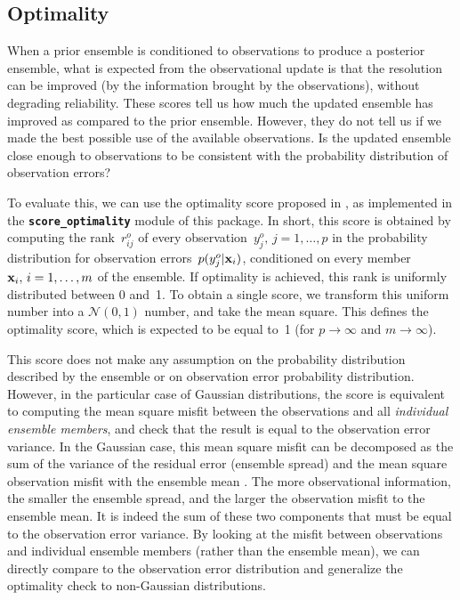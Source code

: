 \documentclass[11pt]{article}
\begin{document}
\subsection{Optimality}

When a prior ensemble is conditioned to observations
to produce a posterior ensemble,
what is expected from the observational update is
that the resolution can be improved (by the information brought
by the observations), without degrading reliability.
These scores tell us how much the updated ensemble has improved
as compared to the prior ensemble.
However, they do not tell us if we made the best possible use of the available observations.
Is the updated ensemble close enough to observations
to be consistent with the probability distribution of observation errors?

To evaluate this, we can use the optimality score proposed in \citet{BRAN19},
as implemented in the {\tt\bf score\_optimality} module of this package.
In short, this score is obtained by computing the rank~$r_{ij}^o$
of every observation~$y^o_j,\,j=1,\ldots,p$ in the probability
distribution for observation errors~$p(y^o_j|{\bf x}_i)$,
conditioned on every member~${\bf x}_i,\,i=1,\ldots,m$ of the ensemble.
If optimality is achieved, this rank is uniformly distributed between 0 and~1.
To obtain a single score, we transform this uniform number
into a ${\mathcal N}(0,1)$ number, and take the mean square.
This defines the optimality score, which is expected to be equal to~1
(for $p\rightarrow\infty$ and $m\rightarrow\infty$).

This score does not make any assumption on the probability distribution
described by the ensemble or on observation error probability distribution.
However, in the particular case of Gaussian distributions,
the score is equivalent to computing the mean square misfit between the observations
and all {\em individual ensemble members},
and check that the result is equal to the observation error variance.
In the Gaussian case, this mean square misfit can be decomposed as the sum
of the variance of the residual error (ensemble spread)
and the mean square observation misfit with the ensemble mean \citep{TALA99}.
The more observational information, the smaller the ensemble spread,
and the larger the observation misfit to the ensemble mean.
It is indeed the sum of these two components that must be equal to the observation error variance.
By looking at the misfit between observations and individual ensemble members (rather than the ensemble mean),
we can directly compare to the observation error distribution
and generalize the optimality check to non-Gaussian distributions.
\end{document}
